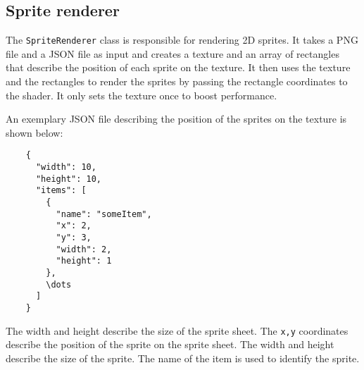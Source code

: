 \subsection{Sprite renderer} \label{sprite_renderer}
The \texttt{SpriteRenderer} class is responsible for rendering 2D sprites.
It takes a PNG file and a JSON file as input and creates a texture and an array of rectangles that describe the position of each sprite on the texture.
It then uses the texture and the rectangles to render the sprites by passing the rectangle coordinates to the shader.
It only sets the texture once to boost performance.

An exemplary JSON file describing the position of the sprites on the texture is shown below:

\begin{verbatim}
    {
      "width": 10,
      "height": 10,
      "items": [
        {
          "name": "someItem",
          "x": 2,
          "y": 3,
          "width": 2,
          "height": 1
        },
        \dots
      ]
    }
\end{verbatim}


The width and height describe the size of the sprite sheet.
The \texttt{x,y} coordinates describe the position of the sprite on the sprite sheet.
The width and height describe the size of the sprite.
The name of the item is used to identify the sprite.


